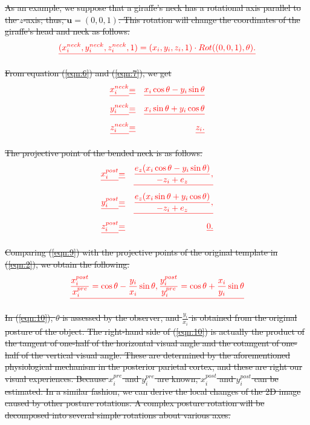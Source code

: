 \documentclass[journal]{IEEEtran}
\providecommand{\DIFdel}[1]{{\protect\color{red}\sout{#1}}}                      %
\begin{document}
\DIFdel{As an example, we suppose that a giraffe's neck has a rotational axis parallel to the $z$-axis; 
thus, $\mathbf{u} = (0,0,1)$. 
This rotation will change the coordinates of the giraffe's head and neck as follows.
}\begin{displaymath}
\DIFdel{(x_i^{neck},y_i^{neck},z_i^{neck},1)=(x_i,y_i,z_i,1)\cdot Rot((0,0,1),\theta).
\label{eqn:7}
}\end{displaymath}

\DIFdel{From equation (\ref{eqn:6}) and (\ref{eqn:7}), we get
}\begin{align*}
\DIFdel{x_i^{neck}}&\DIFdel{=}&\DIFdel{x_i\cos\theta-y_i\sin\theta\nonumber}\\
\DIFdel{y_i^{neck}}&\DIFdel{=}&\DIFdel{x_i\sin\theta+y_i\cos\theta\nonumber}\\
\DIFdel{z_i^{neck}}&\DIFdel{=}&\DIFdel{z_i.
}\end{align*}

\DIFdel{The projective point of the bended neck is as follows.
}\begin{align*}
\DIFdel{x_i^{post}}&\DIFdel{=}&\DIFdel{\frac{e_z(x_i\cos\theta-y_i\sin\theta)}{-z_i+e_z}, \nonumber}\\
\DIFdel{y_i^{post}}&\DIFdel{=}&\DIFdel{\frac{e_z(x_i\sin\theta+y_i\cos\theta)}{-z_i+e_z}, \nonumber}\\
\DIFdel{z_i^{post}}&\DIFdel{=}&\DIFdel{0.
\label{eqn:9}
}\end{align*}

\DIFdel{Comparing (\ref{eqn:9}) with the projective points of the original template in (\ref{eqn:2}),
we obtain the following.
}\begin{displaymath}
\DIFdel{\frac{x_i^{post}}{x_i^{pre}}=\cos\theta-\frac{y_i}{x_i}\sin\theta,
\frac{y_i^{post}}{y_i^{pre}}=\cos\theta+\frac{x_i}{y_i}\sin\theta
\label{eqn:10}
}\end{displaymath}

\DIFdel{In (\ref{eqn:10}), $\theta$ is assessed by the observer, 
and $\frac{y_i}{x_i}$ is obtained from the original posture of the object. 
The right-hand side of (\ref{eqn:10}) is actually the product of the tangent of one-half of the horizontal visual angle and the cotangent of one-half of the vertical visual angle. 
These are determined by the aforementioned physiological mechanism in the posterior parietal cortex, 
and these are right our visual experiences. 
Because $x_i^{pre}$ and $y_i^{pre}$ are known, $x_i^{post}$ and $y_i^{post}$ can be estimated. 
In a similar fashion, we can derive the local changes of the 2D image caused by other posture rotations. 
A complex posture rotation will be decomposed into several simple rotations about various axes.
}%
\end{document}
